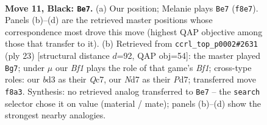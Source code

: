 \documentclass[11pt]{article}
\begin{document}
\clearpage

\begin{figure}[p]\centering
\begin{subfigure}{0.46\textwidth}\centering
\resizebox{\linewidth}{!}{%
\newchessgame
\chessboard[
  setfen={r1b1kb1r/pp1n1ppp/2n1p3/q2pP3/3P3Q/3B1PP1/PP1N3P/R1B1K1NR b KQ - 2 11},
  showmover=false,
  pgfstyle=straightmove, color=movearrow, markmove={f8-e7}
]}
\caption{}
\end{subfigure}\hfill
\begin{subfigure}{0.46\textwidth}\centering
\resizebox{\linewidth}{!}{%
\newchessgame
\chessboard[
  setfen={r1b1kb1r/p1qpnp1p/4p1p1/1p1n4/3P4/2PB1Q1N/PP1N1PPP/R1B1K2R b KQkq - 1 12},
  showmover=false,
  pgfstyle=straightmove, color=movearrow, markmove={f8-g7}
]}
\caption{}
\end{subfigure}
\\[4pt]

\caption{\textbf{Move 11, Black: \texttt{Be7}.} (a) Our position; Melanie plays \texttt{Be7} (\texttt{f8e7}). Panels (b)--(d) are the retrieved master positions whose correspondence most drove this move (highest QAP objective among those that transfer to it). (b) Retrieved from \texttt{ccrl\_top\_p0002\#2631} (ply 23) [structural distance $d$=92, QAP obj=54]: the master played \texttt{Bg7}; under $\mu$ our \emph{Bf1} plays the role of that game's \emph{Bf1}; cross-type roles: our \emph{b}d3 as their \emph{Q}c7, our \emph{N}d7 as their \emph{P}d7; transferred move \texttt{f8a3}. Synthesis: no retrieved analog transferred to \texttt{Be7} -- the \texttt{search} selector chose it on value (material / mate); panels (b)--(d) show the strongest nearby analogies.}
\label{fig:thought-m21}
\end{figure}

\clearpage
\end{document}
